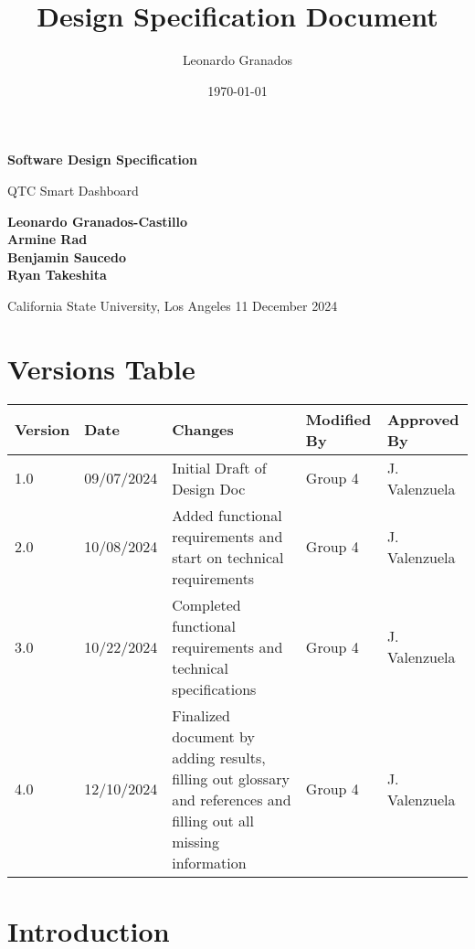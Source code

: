 \documentclass[12pt]{article}
\title{Design Specification Document}
\author{Leonardo Granados}
\date{\today}
\begin{document}
\begin{titlepage}
   \begin{center}
       \vspace*{1cm}

       \textbf{Software Design Specification}

       \vspace{0.5cm}
        QTC Smart Dashboard
            
       \vspace{1.5cm}

       \textbf{Leonardo Granados-Castillo\\Armine Rad\\Benjamin Saucedo\\Ryan Takeshita}

       \vfill
            
            
       \vspace{0.8cm}

       California State University, Los Angeles 11 December 2024 \end{center}
\end{titlepage}

\tableofcontents

\newpage

\section{Versions Table}
\begin{tabular}{|l|l|p{5cm}|l|l|}
\hline
\textbf{Version} & \textbf{Date} & \textbf{Changes} & \textbf{Modified By} & \textbf{Approved By} \\ \hline
1.0 & 09/07/2024 & Initial Draft of Design Doc & Group 4 & J. Valenzuela \\ \hline
2.0 & 10/08/2024 & Added functional requirements and start on technical requirements & Group 4 & J. Valenzuela \\ \hline
3.0 & 10/22/2024 & Completed functional requirements and technical specifications  & Group 4 & J. Valenzuela \\ \hline
4.0 & 12/10/2024 & Finalized document by adding results, filling out glossary and references and filling out all missing information & Group 4 & J. Valenzuela \\ \hline
\end{tabular}

\newpage


\section{Introduction}
\end{document}
